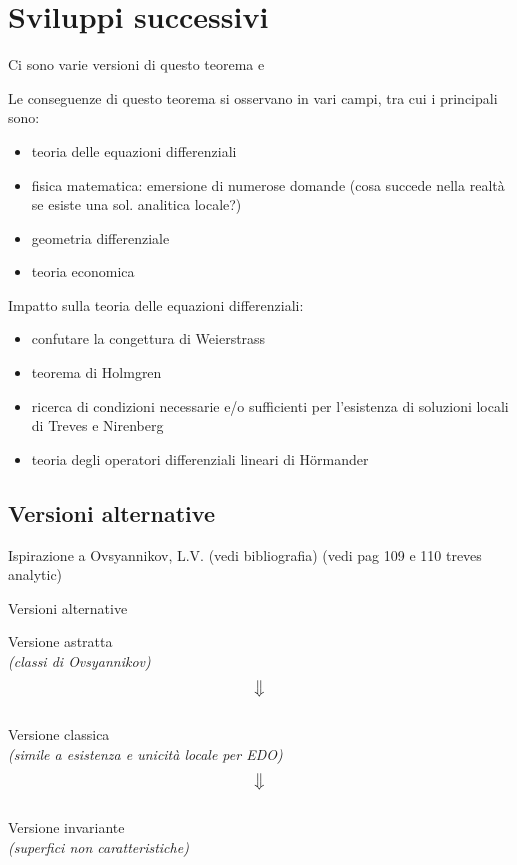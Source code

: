 \chapter{Sviluppi successivi}

Ci sono varie versioni di questo teorema e

Le conseguenze di questo teorema si osservano in vari campi, tra cui i principali sono:
\begin{itemize}
\item teoria delle equazioni differenziali
\item fisica matematica: emersione di numerose domande (cosa succede nella realtà se esiste una sol. analitica locale?)
\item geometria differenziale
\item teoria economica
\end{itemize}

Impatto sulla teoria delle equazioni differenziali:
\begin{itemize}
\item confutare la congettura di Weierstrass
\item teorema di Holmgren
\item ricerca di condizioni necessarie e/o sufficienti per l'esistenza di soluzioni locali di Treves e Nirenberg
\item teoria degli operatori differenziali lineari di Hörmander
\end{itemize}
\section{Versioni alternative}

Ispirazione a Ovsyannikov, L.V. (vedi bibliografia) (vedi pag 109 e 110 treves analytic)


Versioni alternative

\begin{center}
\normalsize Versione astratta \\
\footnotesize\textit{(classi di Ovsyannikov)}\\
\normalsize $$\big\Downarrow$$\\
\normalsize Versione classica \\
\footnotesize\textit{(simile a esistenza e unicità locale per EDO)}\\
\normalsize $$\big\Downarrow$$\\
\normalsize Versione invariante \\
\footnotesize\textit{(superfici non caratteristiche)}\\
\end{center}



